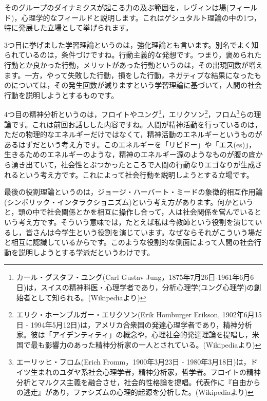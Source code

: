 \documentclass{ltjsbook}
\begin{document}
そのグループのダイナミクスが起こる力の及ぶ範囲を，レヴィンは場(フィールド)，心理学的なフィールドと説明します。これはゲシュタルト理論の中の1つ，特に発展した立場として挙げられます。

3つ目に挙げました学習理論というのは，強化理論とも言います。別名でよく知られているのは，条件づけですね。行動主義的な発想です。つまり，褒められた行動とか良かった行動，メリットがあった行動というのは，その出現回数が増えます。一方，やって失敗した行動，損をした行動，ネガティブな結果になったものについては，その発生回数が減りますという学習理論に基づいて，人間の社会行動を説明しようとするものです。

4つ目の精神分析というのは，フロイトやユング\footnote{カール・グスタフ・ユング(Carl Gustav Jung，1875年7月26日-1961年6月6日)は，スイスの精神科医・心理学者であり，分析心理学(ユング心理学)の創始者として知られる。(Wikipediaより)}，エリクソン\footnote{エリク・ホーンブルガー・エリクソン(Erik Homburger Erikson, 1902年6月15日 - 1994年5月12日)は，アメリカ合衆国の発達心理学者であり，精神分析家。彼は「アイデンティティ」の概念や，心理社会的発達理論を提唱し，米国で最も影響力のあった精神分析家の一人とされている。(Wikipediaより)}，フロム\footnote{エーリッヒ・フロム(Erich Fromm，1900年3月23日 - 1980年3月18日)は，ドイツ生まれのユダヤ系社会心理学者，精神分析家，哲学者。フロイトの精神分析とマルクス主義を融合させ，社会的性格論を提唱。代表作に『自由からの逃走』があり，ファシズムの心理的起源を分析した。(Wikipediaより)}らの理論です。これは前回お話しした内容ですね。人間が精神活動を行っているのは，ただの物理的なエネルギーだけではなくて，精神活動のエネルギーというものがあるはずだという考え方です。このエネルギーを「リビドー」や「エス(es)」，生きるためのエネルギーのような，精神のエネルギー源のようなものが腹の底から湧き出ていて，社会性とぶつかったところで人間の行動なりエゴなりが生成されるという考え方です。これによって社会行動を説明しようとする立場です。

最後の役割理論というのは，ジョージ・ハーバート・ミードの象徴的相互作用論(シンボリック・インタラクショニズム)という考え方があります。何かというと，頭の中で社会関係とかを相互に操作し合って，人は社会関係を営んでいるという考え方です。そういう意味では，たとえば私は今教師という役割を演じているし，皆さんは今学生という役割を演じています。なぜならそれがこういう場だと相互に認識しているからです。このような役割的な側面によって人間の社会行動を説明しようとする学派だというわけです。
\end{document}
